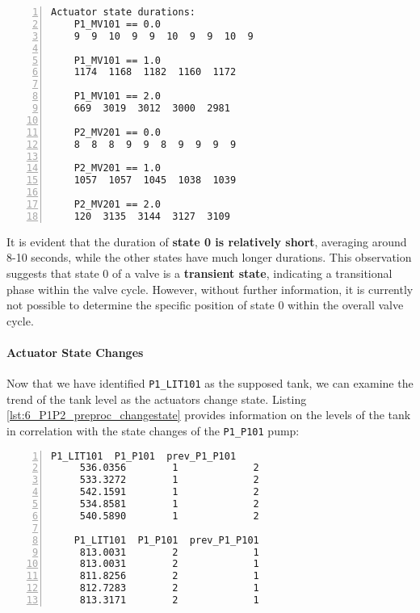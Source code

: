 \begin{lstlisting}[language=bash, numbers=left, caption=Time duration of the states of actuators \texttt{P1\_MV101} and \texttt{P1\_MV201} of PLC1-2, label=lst:6_preproc_P1P2_actuator_duration]
	Actuator state durations:
	P1_MV101 == 0.0
	9  9  10  9  9  10  9  9  10  9
	
	P1_MV101 == 1.0
	1174  1168  1182  1160  1172
	
	P1_MV101 == 2.0
	669  3019  3012  3000  2981
	
	P2_MV201 == 0.0
	8  8  8  9  9  8  9  9  9  9
	
	P2_MV201 == 1.0
	1057  1057  1045  1038  1039
	
	P2_MV201 == 2.0
	120  3135  3144  3127  3109
\end{lstlisting}

It is evident that the duration of \textbf{state 0 is relatively short}, averaging around 8-10 seconds, while the other states have much longer durations. This observation suggests that state 0 of a valve is a \textbf{transient state}, indicating a transitional phase within the valve cycle. However, without further information, it is currently not possible to determine the specific position of state 0 within the overall valve cycle.

\paragraph{Actuator State Changes}
\label{par:6_preproc_P1P2_actuator_state_changes}
Now that we have identified \texttt{P1\_LIT101} as the supposed tank, we can examine the trend of the tank level as the actuators change state. Listing \ref{lst:6_P1P2_preproc_changestate} provides information on the levels of the tank in correlation with the state changes of the \texttt{P1\_P101} pump:

\begin{lstlisting}[language=bash, numbers=left, caption=P1\_P101 state changes in relation to P1\_LIT101, label=lst:6_P1P2_preproc_changestate]
	P1_LIT101  P1_P101  prev_P1_P101
	 536.0356        1             2
	 533.3272        1             2
	 542.1591        1             2
	 534.8581        1             2
	 540.5890        1             2
	
	P1_LIT101  P1_P101  prev_P1_P101
	 813.0031        2             1
	 813.0031        2             1
	 811.8256        2             1
	 812.7283        2             1
	 813.3171        2             1
\end{lstlisting}


